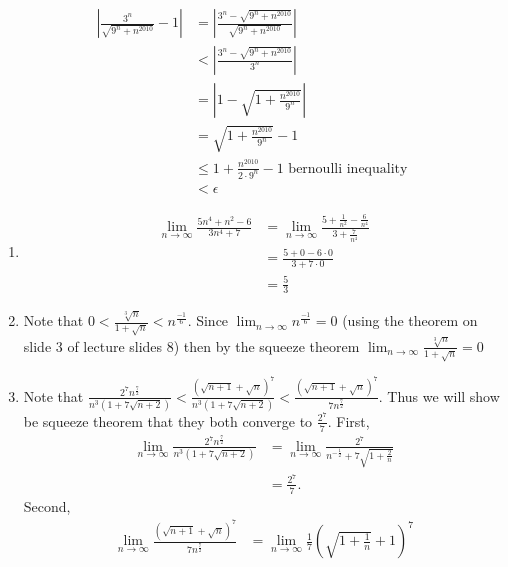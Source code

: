 \documentclass[12pt, letterpaper]{article}
\begin{document}
\begin{enumerate}
\begin{enumerate}
\begin{align*}
			\left| \frac{3^n}{\sqrt{9^n+ n^{2010}}} - 1\right| 
			&= 	\left| \frac{3^n - \sqrt{9^n+ n^{2010}}}{\sqrt{9^n+ n^{2010}}} \right| \\  
			&< \left| \frac{3^n - \sqrt{9^n+ n^{2010}}}{3^n} \right| \\
			&= \left|1 - \sqrt{1 + \frac{n^{2010}}{9^n}}\right|\\
			&= \sqrt{1 + \frac{n^{2010}}{9^n}} - 1\\
			&\leq 1 + \frac{n^{2010}}{2\cdot9^n} - 1 \text{ bernoulli inequality}\\
			&< \epsilon
		\end{align*}
	\end{enumerate}
	\begin{enumerate}
	\item 
	\begin{align*}
		\lim_{n \to \infty} \frac{5n^4 + n^2 -6}{3n^4 + 7} &= \lim_{n \to \infty} \frac{5 + \frac{1}{n^2} - \frac{6}{n^4}}{3 + \frac{7}{n^4}}\\
		&= \frac{5 + 0 - 6\cdot 0 }{3 + 7 \cdot 0}\\
		&= \frac{5}{3}
	\end{align*}
	\item Note that $0 < \frac{\sqrt[3]{n}}{1 + \sqrt{n}} < n^{\frac{-1}{6}}$.  Since $\lim_{n \to \infty} n^{\frac{-1}{6}} = 0$ (using the theorem on slide 3 of lecture slides 8) then by the squeeze theorem $\lim_{n \to \infty} \frac{\sqrt[3]{n}}{1 + \sqrt{n}} = 0$
	\iffalse \begin{align*} 
		\lim_{n \to \infty} \frac{\sqrt[3]{n}}{1 + \sqrt{n}} &= \lim_{n \to \infty} \frac{1}{n^{-\frac{1}{3}} + n^{\frac{1}{6}}}\\
		&= 0 \text{ since } n^\frac{1}{6} \text{ goes to } \infty
	\end{align*}
	\fi 
	\item Note that $\frac{2^7 n^{\frac{7}{2}}}{n^3(1+7\sqrt{n+2})} < \frac{(\sqrt{n+1} +\sqrt{n})^7}{n^3(1+ 7 \sqrt{n+2})} < \frac{(\sqrt{n+1} + \sqrt{n})^7}{7 n^\frac{7}{2}}$.  Thus we will show be squeeze theorem that
	they both converge to $\frac{2^7}{7}$.  First, 
	\begin{align*}
		\lim_{n \to \infty} \frac{2^7 n^{\frac{7}{2}}}{n^3(1+7\sqrt{n+2})} &= \lim_{n \to \infty} \frac{2^7}{n^{-\frac{1}{2}} + 7\sqrt{1 + \frac{2}{n}}}\\
		&= \frac{2^7}{7}.
	\end{align*}
	Second, 
	\begin{align*}
		\lim_{n \to \infty} \frac{(\sqrt{n+1} + \sqrt{n})^7}{7 n^\frac{7}{2}} &= \lim_{n \to \infty} \frac{1}{7}\left(\sqrt{1 + \frac{1}{n}} + 1\right)^7\\

\end{align*}
\end{enumerate}
\end{enumerate}
\end{document}
